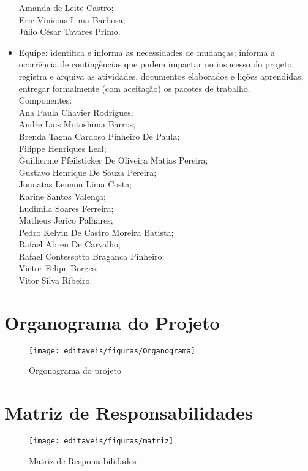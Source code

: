 \begin{itemize}
  Amanda de Leite Castro;\\
  Eric Vinicius Lima Barbosa;\\
  Júlio César Tavares Primo.\\
  \item Equipe: identifica e informa as necessidades de mudanças; informa a ocorrência de contingências que podem impactar no insucesso do projeto; registra e arquiva as atividades, documentos elaborados e lições aprendidas; entregar formalmente (com aceitação) os pacotes de trabalho.\\
Componentes:\\
Ana Paula Chavier Rodrigues;\\
Andre Luis Motoshima Barros;\\
Brenda Tagna Cardoso Pinheiro De Paula;\\
Filippe Henriques Leal;\\
Guilherme Pfeilsticker De Oliveira Matias Pereira;\\
Gustavo Henrique De Souza Pereira;\\
Jonnatas Lennon Lima Costa;\\
Karine Santos Valença;\\
Ludimila Soares Ferreira;\\
Matheus Jerico Palhares;\\
Pedro Kelvin De Castro Moreira Batista;\\
Rafael Abreu De Carvalho;\\
Rafael Contessotto Braganca Pinheiro;\\
Victor Felipe Borges;\\
Vitor Silva Ribeiro.\\
  \end{itemize}
\newpage
\section{Organograma do Projeto}
  \begin{figure}[!ht]
\centering
\texttt{[image: editaveis/figuras/Organograma]}
\caption{Orgonograma do projeto}
\label{Rotulo}
\end{figure}
\FloatBarrier

 \section{Matriz de Responsabilidades}
 \FloatBarrier
 \begin{figure}[h]
\texttt{[image: editaveis/figuras/matriz]}
\label{matrizderesponsabilidades}
\caption{Matriz de Responsabilidades}
 \end{figure}

